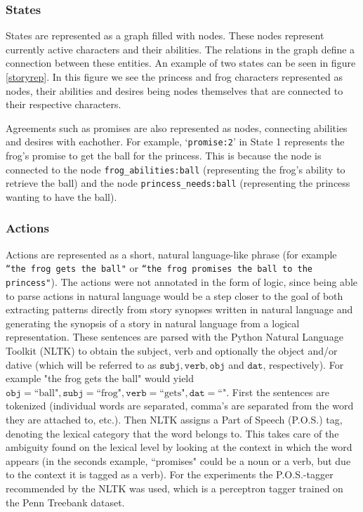 \subsubsection{States}

States are represented as a graph filled with nodes. These nodes represent currently
active characters and their abilities. The relations in the graph define a
connection between these entities.
An example of two states can be seen in figure \ref{storyrep}.
In this figure we see the princess and frog characters represented as nodes,
their abilities and desires being nodes themselves that are connected to their
respective characters. 

Agreements such as promises are also represented as
nodes, connecting abilities and desires with eachother. For example,
`\texttt{promise:2}' in State 1 represents the frog's promise to get the ball for the
princess. This is because the node is connected to the node
\texttt{frog\_abilities:ball} (representing the frog's ability to retrieve the
ball) and the node \texttt{princess\_needs:ball} (representing the princess
wanting to have the ball).

\subsubsection{Actions}

Actions are represented as a short, natural language-like phrase (for example 
\texttt{``the frog gets the ball"}
or \texttt{``the frog promises the ball to the princess"}). The actions were not
annotated in the form of logic, since being able to parse actions in natural
language would be a step closer to the goal of both extracting patterns directly
from story synopses written in natural language and generating the synopsis of a
story in natural language from a logical representation.
These sentences are parsed with the Python Natural Language Toolkit (NLTK)
\cite{BirdKleinLoper09}
to obtain the subject, verb and optionally the object and/or dative (which will be
referred to as $\texttt{subj}, \texttt{verb}, \texttt{obj}$ and $\texttt{dat}$,
respectively). For example "the frog gets the ball" would yield 
$\texttt{obj}=\textrm{``ball"}, \texttt{subj}=\textrm{``frog"},
\texttt{verb}=\textrm{``gets"}, \texttt{dat}=\textrm{``"} $. First the
sentences are tokenized (individual words are separated, comma's are separated
from the word they are attached to, etc.). Then NLTK assigns a
Part of Speech (P.O.S.) tag, denoting the lexical category that the word belongs
to. This takes care of the ambiguity found on the lexical level by looking at
the context in which the word appears (in the seconds example, ``promises" could
be a noun or a verb, but due to the context it is tagged as a verb). For the
experiments the P.O.S.-tagger recommended by the NLTK was used, which is a perceptron tagger
trained on the Penn Treebank dataset.

